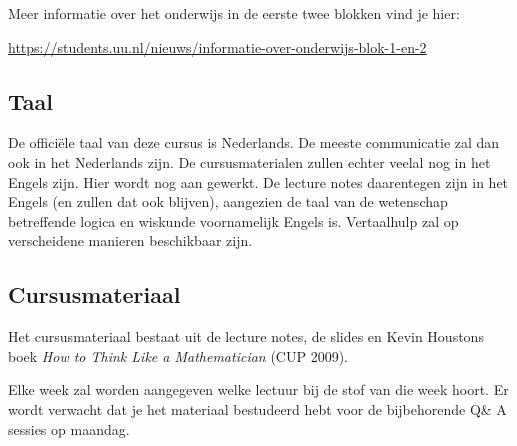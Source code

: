 \documentclass[a4paper,11pt]{article}
\begin{document}
Meer informatie over het onderwijs in de eerste twee blokken vind je hier:
\begin{center}
\url{https://students.uu.nl/nieuws/informatie-over-onderwijs-blok-1-en-2}
\end{center}


\subsection*{Taal}
\label{sec:language}

De officiële taal van deze cursus is Nederlands. De meeste communicatie zal dan ook in het Nederlands zijn. De cursusmaterialen zullen echter veelal nog in het Engels zijn. Hier wordt nog aan gewerkt. De lecture notes daarentegen zijn in het Engels (en zullen dat ook blijven), aangezien de taal van de wetenschap betreffende logica en wiskunde voornamelijk Engels is. Vertaalhulp zal op verscheidene manieren beschikbaar zijn. 
 
\subsection*{Cursusmateriaal}

Het cursusmateriaal bestaat uit de lecture notes, de slides en Kevin Houstons boek \emph{How to Think Like a Mathematician} (CUP 2009).%

Elke week zal worden aangegeven welke lectuur bij de stof van die week hoort. Er wordt verwacht dat je het materiaal bestudeerd hebt voor de bijbehorende Q\& A sessies op maandag.
\end{document}
